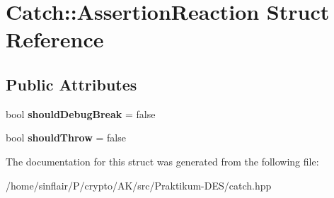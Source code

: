 \hypertarget{structCatch_1_1AssertionReaction}{}\section{Catch\+:\+:Assertion\+Reaction Struct Reference}
\label{structCatch_1_1AssertionReaction}
\subsection*{Public Attributes}
\begin{DoxyCompactItemize}
\item 
\mbox{\label{structCatch_1_1AssertionReaction_adcf30fb90ff20d9789df78d424652497}} 
bool {\bfseries should\+Debug\+Break} = false
\item 
\mbox{\label{structCatch_1_1AssertionReaction_a82c8d95a2c1b6a331bde66982a8e090f}} 
bool {\bfseries should\+Throw} = false
\end{DoxyCompactItemize}


The documentation for this struct was generated from the following file\+:\begin{DoxyCompactItemize}
\item 
/home/sinflair/\+P/crypto/\+A\+K/src/\+Praktikum-\/\+D\+E\+S/catch.\+hpp\end{DoxyCompactItemize}
